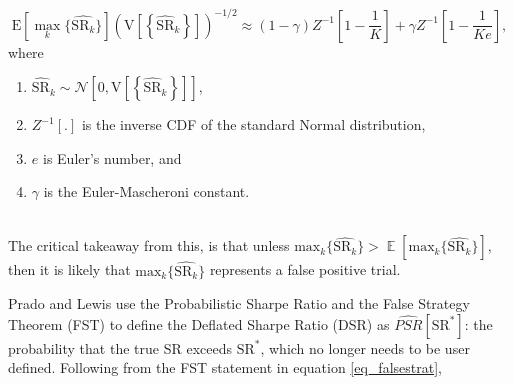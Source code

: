 \documentclass[a4paper,11pt,oneside]{article}
\DeclareMathOperator*{\E}{\mathbb{E}}
\theoremstyle{plain}
\theoremstyle{definition}
\begin{document}
	\begin{equation}\label{eq_falsestrat}
		\mathrm{E}\left[{\max_k}\{\widehat{\mathrm{SR}_k}\}\right]\left(\mathrm{V}\left[\left\{\widehat{\mathrm{SR}}_{k}\right\}\right]\right)^{-1 / 2}\approx(1-\gamma) Z^{-1}\left[1-\frac{1}{K}\right]+\gamma Z^{-1}\left[1-\frac{1}{K e}\right], 
	\end{equation}
		where
	\begin{enumerate}
		\item $\widehat{\mathrm{SR}}_{k} \sim \mathcal{N}\left[0, \mathrm{V}\left[\left\{\widehat{\mathrm{SR}}_{k}\right\}\right]\right]$, 
		\item $Z^{-1}[.]$ is the inverse CDF of the standard Normal distribution, 
		\item $e$ is Euler's number, and 
		\item $\gamma$ is the Euler-Mascheroni constant.
	\end{enumerate}
	~\\
	The critical takeaway from this, is that unless $\mathrm{max}_k\{\widehat{\mathrm{SR}_k}\} > \E\left[\mathrm{max}_k\{\widehat{\mathrm{SR}_k}\}\right]$, then it is likely that $\mathrm{max}_k\{\widehat{\mathrm{SR}_k}\}$ represents a false positive trial.\newline
	
	Prado and Lewis use the Probabilistic Sharpe Ratio and the False Strategy Theorem (FST) to define the Deflated Sharpe Ratio (DSR) as $\widehat{PSR}[\mathrm{SR}^*]$: the probability that the true SR exceeds $\mathrm{SR}^*$, which no longer needs to be user defined. Following from the FST statement in equation \eqref{eq_falsestrat}, 
\end{document}

